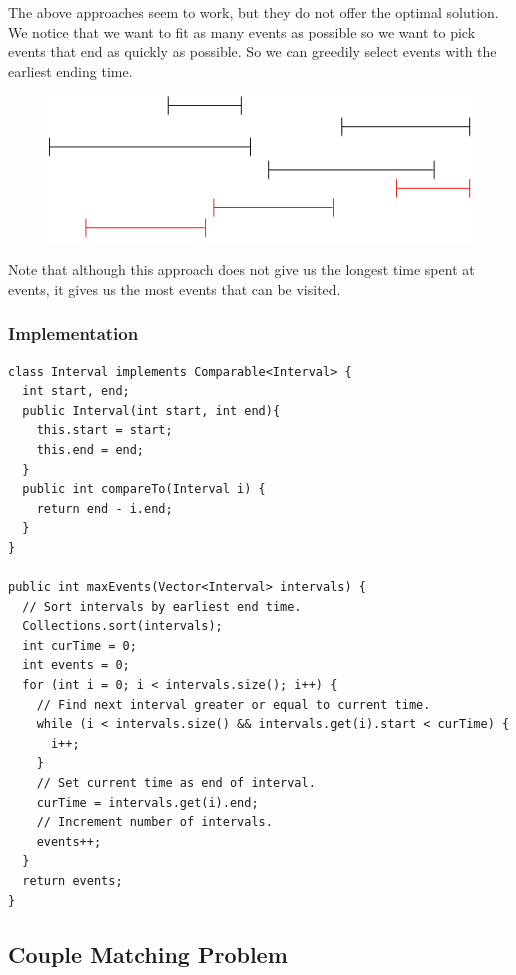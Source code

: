 \documentclass[11pt,oneside]{book}
\makeatletter
\def\maxwidth#1{\ifdim\Gin@nat@width>#1 #1\else\Gin@nat@width\fi}
\makeatother
\begin{document}
The above approaches seem to work, but they do not offer the optimal solution.  We notice that we want to fit as many events as possible so we want to pick events that end as quickly as possible. So we can greedily select events with the earliest ending time.

\vspace{5px}\begin{figure}[H]\centering
        \includegraphics[width=0.66\maxwidth{\textwidth}]{intervalschedule4.png}
        \end{figure}

Note that although this approach does not give us the longest time spent at events, it gives us the most events that can be visited.

\subsubsection{Implementation}

\begin{lstlisting}
class Interval implements Comparable<Interval> {
  int start, end;
  public Interval(int start, int end){
    this.start = start;
    this.end = end;
  }
  public int compareTo(Interval i) {
    return end - i.end;
  }
}

public int maxEvents(Vector<Interval> intervals) {
  // Sort intervals by earliest end time.
  Collections.sort(intervals);
  int curTime = 0;
  int events = 0;
  for (int i = 0; i < intervals.size(); i++) {
    // Find next interval greater or equal to current time.
    while (i < intervals.size() && intervals.get(i).start < curTime) {
      i++;
    }
    // Set current time as end of interval.
    curTime = intervals.get(i).end;
    // Increment number of intervals.
    events++;
  }
  return events;
}
\end{lstlisting}

\subsection{Couple Matching Problem}
\end{document}
